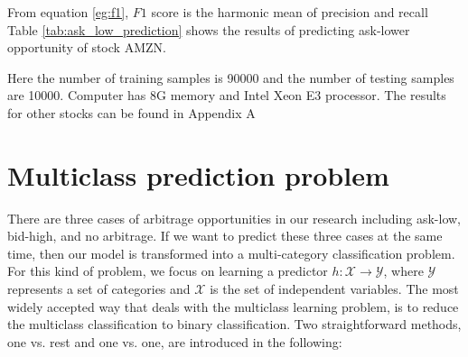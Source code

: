 From equation \ref{eg:f1},   $F1$ score is the harmonic mean of precision and recall\\ 
Table \ref{tab:ask_low_prediction} shows the results of predicting ask-lower opportunity of stock AMZN.
\begin{table} [hp]
	\caption{AMZN ask-low arbitrage opportunities prediction(5 seconds)}
	\label{tab:ask_low_prediction}
	\begin{center}
	\end{center}
\end{table}
 
Here the number of training samples is 90000 and the number of testing samples are 10000. Computer has 8G memory and Intel Xeon E3 processor. The results for other stocks can be found in Appendix A\\

\section{Multiclass prediction problem}

There are three cases of arbitrage opportunities in our research including ask-low, bid-high,  and no arbitrage. If we want to predict these three cases at the same time,  then our model is transformed into a multi-category classification problem. For this kind of problem,  we focus on learning a predictor $h:\mathcal{X}\rightarrow \mathcal{Y}$,  where $\mathcal{Y}$ represents a set of categories and $\mathcal{X}$ is the set of independent variables. The most widely accepted way that deals with the multiclass learning problem,  is to reduce the multiclass classification to binary classification.  Two straightforward methods,  one vs. rest and one vs. one,  are introduced in the following:

